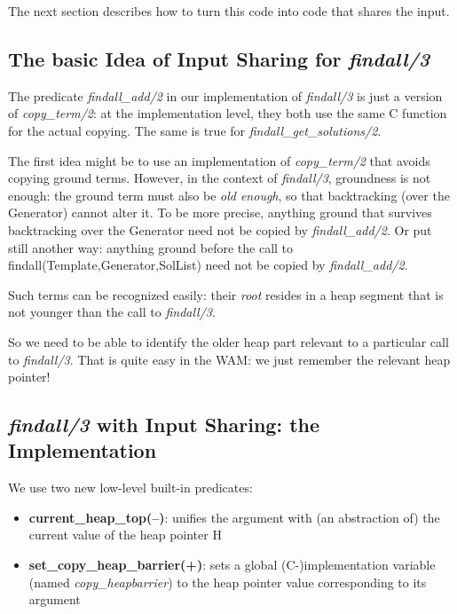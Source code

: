 \documentclass{tlp}
\begin{document}
The next section describes how to turn this code into code that shares
the input.

\subsection{The basic Idea of Input Sharing for {\em findall/3}}

\begin{sloppypar}
The predicate {\em findall\_add/2} in our implementation of {\em findall/3} is just a
version of {\em copy\_term/2}: at the implementation level, they both use
the same C function for the actual copying. The same is true for
{\em findall\_get\_solutions/2}.
\end{sloppypar}


The first idea might be to use an implementation of {\em copy\_term/2} that
avoids copying ground terms. However, in the context of {\em findall/3},
groundness is not enough: the ground term must also be {\em old
  enough}, so that backtracking (over the Generator) cannot alter
it. To be more precise, anything ground that survives backtracking
over the Generator need not be copied by {\em findall\_add/2}. Or put still
another way: anything ground before the call to
findall(Template,Generator,SolList) need not be copied by
{\em findall\_add/2}.

Such terms can be recognized easily: their {\em root} resides in a
heap segment that is not younger than the call to {\em findall/3}.

So we need to be able to identify the older heap part relevant to a
particular call to {\em findall/3}. That is quite easy in the WAM: we just
remember the relevant heap pointer! 


\subsection{{\em findall/3} with Input Sharing: the Implementation}\label{impl}

We use two new low-level built-in predicates:
\begin{sloppypar}
\begin{itemize}
\item {\bf current\_heap\_top(--)}: unifies the argument with (an
abstraction of) the current value of the heap pointer H
\item {\bf set\_copy\_heap\_barrier(+)}: sets a global
(C-)implementation variable (named {\em copy\_heapbarrier}) to the
heap pointer value corresponding to its argument
\end{itemize}
\end{sloppypar}
\end{document}
